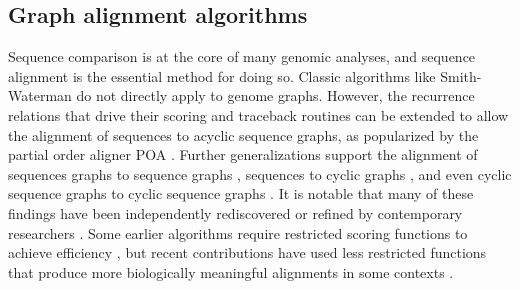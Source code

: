 \subsection{Graph alignment algorithms}
\label{sec:graphalignment}

Sequence comparison is at the core of many genomic analyses, and sequence alignment is the essential method for doing so. 
Classic algorithms like Smith-Waterman \cite{Smith_1981} do not directly apply to genome graphs.
However, the recurrence relations that drive their scoring and traceback routines can be extended to allow the alignment of sequences to acyclic sequence graphs, as popularized by the partial order aligner \textsc{POA} \cite{Lee_2002}.
Further generalizations support the alignment of sequences graphs to sequence graphs \cite{Grasso_2004}, sequences to cyclic graphs \cite{Navarro_2000}, and even cyclic sequence graphs to cyclic sequence graphs \cite{Myers_1989, Amir_1997}. %
It is notable that many of these findings have been independently rediscovered or refined by contemporary researchers \cite{Antipov_2015, Rautiainen_2017, Jain_2019a,kural2014methods}.
Some earlier algorithms require restricted scoring functions to achieve efficiency \cite{Rautiainen_2017}, but recent contributions have used less restricted functions that produce more biologically meaningful alignments in some contexts \cite{Jain_2019a}.







